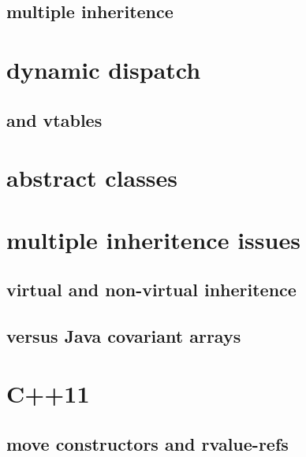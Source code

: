 

\subsection{multiple inheritence}



\section{dynamic dispatch}



\subsection{and vtables}



\section{abstract classes}



\section{multiple inheritence issues}

\subsection{virtual and non-virtual inheritence}



\subsection{versus Java covariant arrays}



\section{C++11}



\subsection{move constructors and rvalue-refs}

